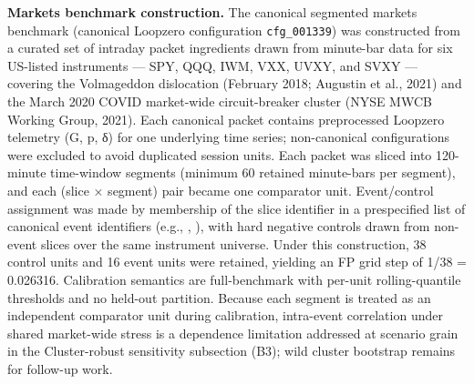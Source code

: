 \documentclass[
  11pt,
]{article}
\begin{document}
\textbf{Markets benchmark construction.} The canonical segmented markets
benchmark \texttt{} (canonical Loopzero
configuration \texttt{cfg\_001339}) was constructed from a curated set
of intraday packet ingredients drawn from minute-bar data for six
US-listed instruments --- SPY, QQQ, IWM, VXX, UVXY, and SVXY ---
covering the Volmageddon dislocation (February 2018; Augustin et al.,
2021) and the March 2020 COVID market-wide circuit-breaker cluster (NYSE
MWCB Working Group, 2021). Each canonical packet contains preprocessed
Loopzero telemetry (G, p, δ) for one underlying time series;
non-canonical configurations were excluded to avoid duplicated session
units. Each packet was sliced into 120-minute time-window segments
(minimum 60 retained minute-bars per segment), and each (slice ×
segment) pair became one comparator unit. Event/control assignment was
made by membership of the slice identifier in a prespecified list of
canonical event identifiers (e.g., \texttt{},
\texttt{}), with hard negative controls drawn
from non-event slices over the same instrument universe. Under this
construction, 38 control units and 16 event units were retained,
yielding an FP grid step of 1/38 = 0.026316. Calibration semantics are
full-benchmark with per-unit rolling-quantile thresholds and no held-out
partition. Because each segment is treated as an independent comparator
unit during calibration, intra-event correlation under shared
market-wide stress is a dependence limitation addressed at scenario
grain in the Cluster-robust sensitivity subsection (B3); wild cluster
bootstrap remains for follow-up work.
\end{document}
